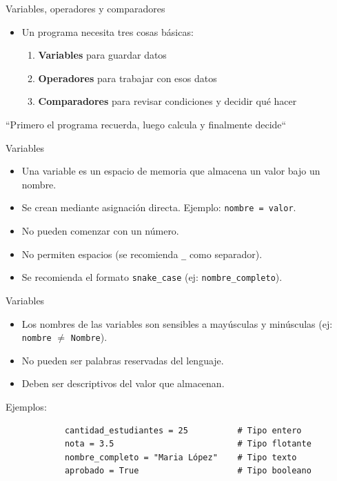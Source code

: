 \documentclass{beamer}
\begin{document}
    \begin{frame}{Variables, operadores y comparadores}
        \begin{itemize}
            \item Un programa necesita tres cosas básicas:
            \begin{enumerate}
                \item \textbf{Variables} para guardar datos
                \item \textbf{Operadores} para trabajar con esos datos
                \item \textbf{Comparadores} para revisar condiciones y decidir qué hacer
            \end{enumerate}
        \end{itemize}

        ``Primero el programa recuerda, luego calcula y finalmente decide``
   \end{frame}

    \begin{frame}[fragile,t]{Variables}
        \begin{itemize}
            \item Una variable es un espacio de memoria que almacena un valor bajo un nombre.
            \item Se crean mediante asignación directa. Ejemplo: \texttt{nombre = valor}.
            \item No pueden comenzar con un número.
            \item No permiten espacios (se recomienda \texttt{_} como separador).
            \item Se recomienda el formato \texttt{snake_case} (ej: \texttt{nombre_completo}).
        \end{itemize}
    \end{frame}

    \begin{frame}[fragile,t]{Variables}
        \begin{itemize}
            \item Los nombres de las variables son sensibles a mayúsculas y minúsculas (ej: \texttt{nombre} $\neq$ \texttt{Nombre}).
            \item No pueden ser palabras reservadas del lenguaje.
            \item Deben ser descriptivos del valor que almacenan.
        \end{itemize}
        Ejemplos:
        \begin{verbatim}
            cantidad_estudiantes = 25          # Tipo entero
            nota = 3.5                         # Tipo flotante
            nombre_completo = "Maria López"    # Tipo texto
            aprobado = True                    # Tipo booleano
        \end{verbatim}
    \end{frame}
\end{document}
